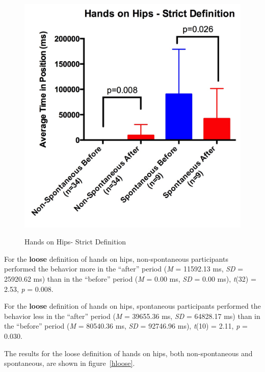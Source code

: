 \documentclass{acm_proc_article-sp}
\begin{document}
\begin{figure}[t!]
\centering
 \includegraphics[width=1.00\linewidth]{images/hstrict.jpg}\\
 \caption{Hands on Hips- Strict Definition} 
 \label{hstrict} %
\end{figure}

For the \textbf{loose} definition of hands on hips, non-spontaneous participants performed the behavior more in the ``after'' period (\textit{M} = 11592.13 ms, \textit{SD} = 25920.62 ms) than in the ``before'' period (\textit{M} = 0.00 ms, \textit{SD} = 0.00 ms), \textit{t}(32) = 2.53, \textit{p} = 0.008.

For the \textbf{loose} definition of hands on hips, spontaneous participants performed the behavior less in the ``after'' period (\textit{M} = 39655.36 ms, \textit{SD} = 64828.17 ms) than in the ``before'' period (\textit{M} = 80540.36 ms, \textit{SD} = 92746.96 ms), \textit{t}(10) = 2.11, \textit{p} = 0.030.

The results for the loose definition of hands on hips, both non-spontaneous and spontaneous, are shown in figure~\ref{hloose}.
\end{document}
